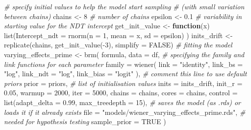 \documentclass[
  11pt,
  english,
  ,doc,floatsintext]{apa6}
\newenvironment{Shaded}{}{}
\newcommand{\AttributeTok}[1]{\textcolor[rgb]{0.49,0.56,0.16}{#1}}
\newcommand{\CommentTok}[1]{\textcolor[rgb]{0.38,0.63,0.69}{\textit{#1}}}
\newcommand{\ConstantTok}[1]{\textcolor[rgb]{0.53,0.00,0.00}{#1}}
\newcommand{\ControlFlowTok}[1]{\textcolor[rgb]{0.00,0.44,0.13}{\textbf{#1}}}
\newcommand{\DecValTok}[1]{\textcolor[rgb]{0.25,0.63,0.44}{#1}}
\newcommand{\FloatTok}[1]{\textcolor[rgb]{0.25,0.63,0.44}{#1}}
\newcommand{\FunctionTok}[1]{\textcolor[rgb]{0.02,0.16,0.49}{#1}}
\newcommand{\NormalTok}[1]{#1}
\newcommand{\OtherTok}[1]{\textcolor[rgb]{0.00,0.44,0.13}{#1}}
\newcommand{\SpecialCharTok}[1]{\textcolor[rgb]{0.25,0.44,0.63}{#1}}
\newcommand{\StringTok}[1]{\textcolor[rgb]{0.25,0.44,0.63}{#1}}
\begin{document}
\begin{Shaded}
\begin{Highlighting}[]
\CommentTok{\# specify initial values to help the model start sampling}
\CommentTok{\# (with small variation between chains)}
\NormalTok{chains }\OtherTok{\textless{}{-}} \DecValTok{8} \CommentTok{\# number of chains}
\NormalTok{epsilon }\OtherTok{\textless{}{-}} \FloatTok{0.1} \CommentTok{\# variability in starting value for the NDT intercept}
\NormalTok{get\_init\_value }\OtherTok{\textless{}{-}} \ControlFlowTok{function}\NormalTok{(x) }\FunctionTok{list}\NormalTok{(}\AttributeTok{Intercept\_ndt =} \FunctionTok{rnorm}\NormalTok{(}\AttributeTok{n =} \DecValTok{1}\NormalTok{, }\AttributeTok{mean =}\NormalTok{ x, }\AttributeTok{sd =}\NormalTok{ epsilon) )}
\NormalTok{inits\_drift }\OtherTok{\textless{}{-}} \FunctionTok{replicate}\NormalTok{(chains, }\FunctionTok{get\_init\_value}\NormalTok{(}\SpecialCharTok{{-}}\DecValTok{3}\NormalTok{), }\AttributeTok{simplify =} \ConstantTok{FALSE}\NormalTok{)}
\CommentTok{\# fitting the model}
\NormalTok{varying\_effects\_prime }\OtherTok{\textless{}{-}} \FunctionTok{brm}\NormalTok{(}
\NormalTok{  formula, }
  \AttributeTok{data =}\NormalTok{ df,}
  \CommentTok{\# specifying the family and link functions for each parameter}
  \AttributeTok{family =} \FunctionTok{wiener}\NormalTok{(}
    \AttributeTok{link =} \StringTok{"identity"}\NormalTok{, }\AttributeTok{link\_bs =} \StringTok{"log"}\NormalTok{,}
    \AttributeTok{link\_ndt =} \StringTok{"log"}\NormalTok{, }\AttributeTok{link\_bias =} \StringTok{"logit"}
\NormalTok{    ),}
  \CommentTok{\# comment this line to use default priors}
  \AttributeTok{prior =}\NormalTok{ priors,}
  \CommentTok{\# list of initialisation values}
  \AttributeTok{inits =}\NormalTok{ inits\_drift,}
  \AttributeTok{init\_r =} \FloatTok{0.05}\NormalTok{,}
  \AttributeTok{warmup =} \DecValTok{2000}\NormalTok{, }\AttributeTok{iter =} \DecValTok{5000}\NormalTok{,}
  \AttributeTok{chains =}\NormalTok{ chains, }\AttributeTok{cores =}\NormalTok{ chains,}
  \AttributeTok{control =} \FunctionTok{list}\NormalTok{(}\AttributeTok{adapt\_delta =} \FloatTok{0.99}\NormalTok{, }\AttributeTok{max\_treedepth =} \DecValTok{15}\NormalTok{),}
  \CommentTok{\# saves the model (as .rds) or loads it if it already exists}
  \AttributeTok{file =} \StringTok{"models/wiener\_varying\_effects\_prime.rds"}\NormalTok{,}
  \CommentTok{\# needed for hypothesis testing}
  \AttributeTok{sample\_prior =} \ConstantTok{TRUE}
\NormalTok{  )}
\end{Highlighting}
\end{Shaded}
\end{document}
